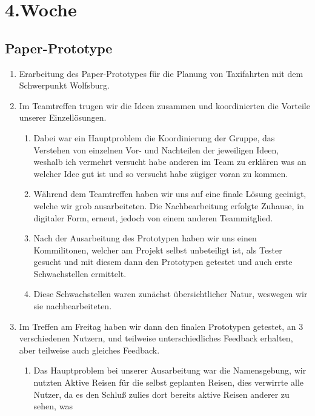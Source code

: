\chapter{4.\hspace{0.5em}Woche}\label{wo4}

\section{Paper-Prototype}\label{wo4_1}

\begin{enumerate}[label={\Roman*}]
	\item Erarbeitung des Paper-Prototypes f\"ur die Planung von Taxifahrten mit dem Schwerpunkt Wolfsburg.
	\item Im Teamtreffen trugen wir die Ideen zusammen und koordinierten die Vorteile unserer Einzell\"osungen.
	\begin{enumerate}[label={\arabic*}]
		\item Dabei war ein Hauptproblem die Koordinierung der Gruppe, das Verstehen von einzelnen Vor- und Nachteilen
der jeweiligen Ideen, weshalb ich vermehrt versucht habe anderen im Team zu erkl\"aren was an welcher
Idee gut ist und so versucht habe z\"ugiger voran zu kommen. 
		\item W\"ahrend dem Teamtreffen haben wir uns auf eine finale L\"osung geeinigt, welche wir grob ausarbeiteten.
Die Nachbearbeitung erfolgte Zuhause, in digitaler Form, erneut, jedoch von einem anderen Teammitglied.
		\item Nach der Ausarbeitung des Prototypen haben wir uns einen Kommilitonen, welcher am Projekt selbst
unbeteiligt ist, als Tester gesucht und mit diesem dann den Prototypen getestet und auch erste Schwachstellen ermittelt.
		\item Diese Schwachstellen waren zun\"achst \"ubersichtlicher Natur, weswegen wir sie nachbearbeiteten.
	\end{enumerate}
	\item Im Treffen am Freitag haben wir dann den finalen Prototypen getestet, an 3 verschiedenen Nutzern, und teilweise
unterschiedliches Feedback erhalten, aber teilweise auch gleiches Feedback.
	\begin{enumerate}[label={\arabic*}]
		\item Das Hauptproblem bei unserer Ausarbeitung war die Namensgebung, wir nutzten Aktive Reisen f\"ur die selbst
geplanten Reisen, dies verwirrte alle Nutzer, da es den Schlu\ss{} zulies dort bereits aktive Reisen anderer zu sehen, was

\end{enumerate}
\end{enumerate}
